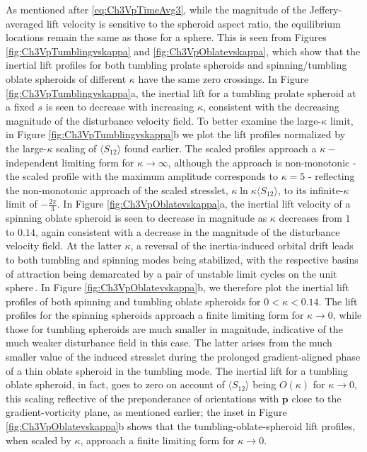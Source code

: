 \documentclass{jfm}
\begin{document}
As mentioned after \eqref{eq:Ch3VpTimeAvg3}, while the magnitude of the Jeffery-averaged lift velocity is sensitive to the spheroid aspect ratio, the equilibrium locations remain the same as those for a sphere. This is seen from Figures \ref{fig:Ch3VpTumblingvskappa} and \ref{fig:Ch3VpOblatevskappa}, which show that the inertial lift profiles for both tumbling prolate spheroids and spinning/tumbling oblate spheroids of different $\kappa$ have the same zero crossings. In Figure \ref{fig:Ch3VpTumblingvskappa}a, the inertial lift for a tumbling prolate spheroid at a fixed $s$ is seen to decrease with increasing $\kappa$, consistent with the decreasing magnitude of the disturbance velocity field. To better examine the  large-$\kappa$ limit, in Figure \ref{fig:Ch3VpTumblingvskappa}b we plot the lift profiles normalized by the large-$\kappa$ scaling of $\langle S_{12} \rangle$ found earlier. The scaled profiles approach a $\kappa-$independent limiting form for $\kappa\to\infty$, although the approach is non-monotonic - the scaled profile with the maximum amplitude corresponds to $\kappa = 5$ - reflecting the non-monotonic approach of the scaled stresslet, $\kappa \ln \kappa\langle S_{12} \rangle$, to its infinite-$\kappa$ limit of $-\frac{2\pi}{3}$. In Figure \ref{fig:Ch3VpOblatevskappa}a, the inertial lift velocity of a spinning oblate spheroid is seen to decrease in magnitude as $\kappa$ decreases from $1$ to $0.14$, again consistent with a decrease in the magnitude of the disturbance velocity field. At the latter $\kappa$, a reversal of the inertia-induced orbital drift leads to both tumbling and spinning modes being stabilized, with the respective basins of attraction being demarcated by a pair of unstable limit cycles on the unit sphere\,\citep{navaneeth2016,einarsson2015}. In Figure \ref{fig:Ch3VpOblatevskappa}b, we therefore plot the inertial lift profiles of both spinning and tumbling oblate spheroids for $0 < \kappa < 0.14$. The lift profiles for the spinning spheroids approach a finite limiting form for $\kappa \rightarrow 0$, while those for tumbling spheroids are much smaller in magnitude, indicative of the much weaker disturbance field in this case. The latter arises from the much smaller value of the induced stresslet during the prolonged gradient-aligned phase of a thin oblate spheroid in the tumbling mode. The inertial lift for a tumbling oblate spheroid, in fact, goes to zero on account of $\langle S_{12} \rangle$ being $O(\kappa)$ for $\kappa\to 0$, this scaling reflective of the preponderance of orientations with $\bm{p}$ close to the gradient-vorticity plane, as mentioned earlier; the inset in Figure \ref{fig:Ch3VpOblatevskappa}b shows that the tumbling-oblate-spheroid lift profiles, when scaled by $\kappa$, approach a finite limiting form for $\kappa \to 0$.
\end{document}
